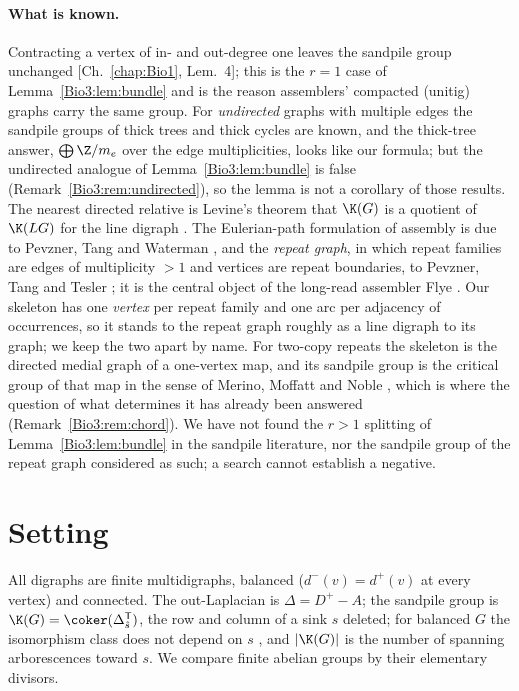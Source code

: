 \paragraph{What is known.} Contracting a vertex of in- and out-degree one leaves the
sandpile group unchanged [Ch.~\ref{chap:Bio1}, Lem.~4]; this is the $r=1$ case of
Lemma~\ref{Bio3:lem:bundle} and is the reason assemblers' compacted (unitig) graphs
\cite{BCALM,KM} carry the same group. For \emph{undirected} graphs with multiple edges
the sandpile groups of thick trees \cite{ChenSchedler} and thick cycles \cite{Alar} are
known, and the thick-tree answer, $\bigoplus\Z/m_e$ over the edge multiplicities, looks
like our formula; but the undirected analogue of Lemma~\ref{Bio3:lem:bundle} is false
(Remark~\ref{Bio3:rem:undirected}), so the lemma is not a corollary of those results. The
nearest directed relative is Levine's theorem that $\K(G)$ is a quotient of $\K(LG)$ for
the line digraph \cite{Levine,PSX}. The Eulerian-path formulation of assembly is due to
Pevzner, Tang and Waterman \cite{PTW}, and the \emph{repeat graph}, in which repeat
families are edges of multiplicity $>1$ and vertices are repeat boundaries, to Pevzner,
Tang and Tesler \cite{PTT}; it is the central object of the long-read assembler Flye
\cite{Flye}. Our skeleton has one \emph{vertex} per repeat family and one arc per
adjacency of occurrences, so it stands to the repeat graph roughly as a line digraph to
its graph; we keep the two apart by name. For two-copy repeats the skeleton is the
directed medial graph of a one-vertex map, and its sandpile group is the critical group
of that map in the sense of Merino, Moffatt and Noble \cite{MMN}, which is where the
question of what determines it has already been answered (Remark~\ref{Bio3:rem:chord}). We
have not found the $r>1$ splitting of Lemma~\ref{Bio3:lem:bundle} in the sandpile literature,
nor the sandpile group of the repeat graph considered as such; a search cannot establish
a negative.

\section{Setting}\label{Bio3:sec:setting}

All digraphs are finite multidigraphs, balanced ($d^-(v)=d^+(v)$ at every vertex) and
connected. The out-Laplacian is $\Delta=D^+-A$; the sandpile group is
$\K(G)=\coker(\Delta_{\hat s}^{\mathsf T})$, the row and column of a sink $s$ deleted; for
balanced $G$ the isomorphism class does not depend on $s$ \cite[Lem.~4.12]{HLMPPW}, and
$|\K(G)|$ is the number of spanning arborescences toward $s$. We compare finite abelian
groups by their elementary divisors.

